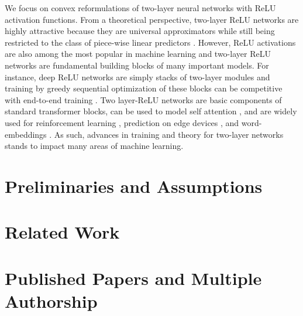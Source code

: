 We focus on convex reformulations of two-layer neural networks with ReLU
activation functions.
From a theoretical perspective, two-layer ReLU networks are highly attractive
because they are universal approximators while still being restricted to the
class of piece-wise linear predictors \citep{huang2020universal}.
However, ReLU activations are also among the most popular in machine learning
\citep{szandala2020review} and two-layer ReLU networks are fundamental building
blocks of many important models.
For instance, deep ReLU networks are simply stacks of two-layer modules and
training by greedy sequential optimization of these blocks can be competitive
with end-to-end training \citep{belilovsky2019greedy}.
Two layer-ReLU networks are basic components of standard transformer blocks,
can be used to model self attention \citep{sahiner2022attention}, and are
widely used for reinforcement learning \citep{gaur2023global}, prediction on
edge devices \citep{teerapittayanon2017distributed}, and word-embeddings
\citep{mikolov2013word}.
As such, advances in training and theory for two-layer networks stands to
impact many areas of machine learning.



\section{Preliminaries and Assumptions}

\section{Related Work}

\section{Published Papers and Multiple Authorship}

